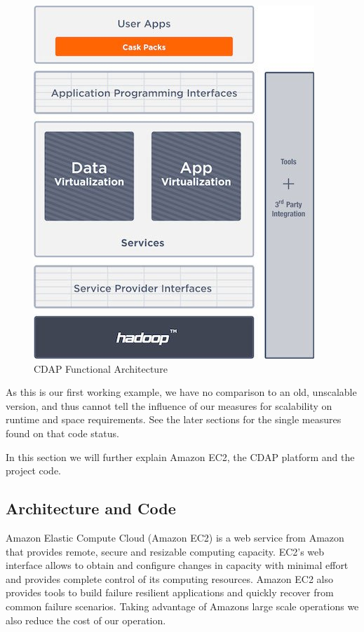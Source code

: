 \documentclass[
10pt, %
a4paper, %
oneside, %
headinclude,footinclude, %
useAMS,
usenatbib
]{template/mn2e}  %
\begin{document}
\begin{figure}
    \centering
    \includegraphics[width=0.95\columnwidth]{src/cdap_architecture}
    \caption{CDAP Functional Architecture}
    \label{fig:cdap}
\end{figure}

As this is our first working example, we have no comparison to an old, unscalable version, and thus cannot tell the influence of our measures for scalability on runtime and space requirements. See the later sections for the single measures found on that code status.


In this section we will further explain Amazon EC2, the CDAP platform and the project code.


\subsection{Architecture and Code}
Amazon Elastic Compute Cloud (Amazon EC2) is a web service from Amazon that provides remote, secure and resizable computing capacity. EC2’s web interface allows to obtain and configure changes in capacity with minimal effort and provides complete control of its computing resources. Amazon EC2 also provides tools to build failure resilient applications and quickly recover from common failure scenarios. Taking advantage of Amazons large scale operations we also reduce the cost of our operation.
\end{document}
